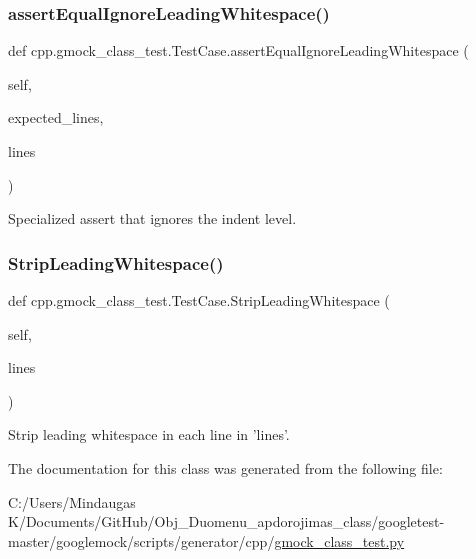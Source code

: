 \subsubsection{\texorpdfstring{assertEqualIgnoreLeadingWhitespace()}{assertEqualIgnoreLeadingWhitespace()}}
{\footnotesize\ttfamily def cpp.\+gmock\+\_\+class\+\_\+test.\+Test\+Case.\+assert\+Equal\+Ignore\+Leading\+Whitespace (\begin{DoxyParamCaption}\item[{}]{self,  }\item[{}]{expected\+\_\+lines,  }\item[{}]{lines }\end{DoxyParamCaption})}

\begin{DoxyVerb}Specialized assert that ignores the indent level.\end{DoxyVerb}
 \mbox{\label{classcpp_1_1gmock__class__test_1_1_test_case_a366b15717eebc41e397357868c5734c5}} 
\subsubsection{\texorpdfstring{StripLeadingWhitespace()}{StripLeadingWhitespace()}}
{\footnotesize\ttfamily def cpp.\+gmock\+\_\+class\+\_\+test.\+Test\+Case.\+Strip\+Leading\+Whitespace (\begin{DoxyParamCaption}\item[{}]{self,  }\item[{}]{lines }\end{DoxyParamCaption})}

\begin{DoxyVerb}Strip leading whitespace in each line in 'lines'.\end{DoxyVerb}
 

The documentation for this class was generated from the following file\+:\begin{DoxyCompactItemize}
\item 
C\+:/\+Users/\+Mindaugas K/\+Documents/\+Git\+Hub/\+Obj\+\_\+\+Duomenu\+\_\+apdorojimas\+\_\+class/googletest-\/master/googlemock/scripts/generator/cpp/\mbox{\hyperlink{googletest-master_2googlemock_2scripts_2generator_2cpp_2gmock__class__test_8py}{gmock\+\_\+class\+\_\+test.\+py}}\end{DoxyCompactItemize}
